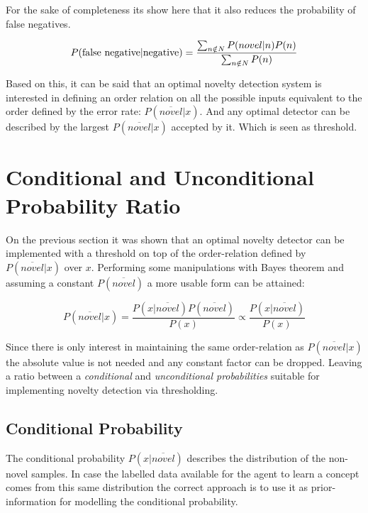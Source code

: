 For the sake of completeness its show here that it also reduces the probability
of false negatives.

\begin{equation}
P(\textnormal{false negative}|\textnormal{negative}) = \frac{\sum_{n \notin N}{P(novel|n)P(n)}}{\sum_{n \notin N}{P(n)}}
\end{equation}


Based on this, it can be said that an optimal novelty detection system is
interested in defining an order relation on all the possible inputs equivalent
to the order defined by the error rate: $P(\overline{novel}|x)$.
And any optimal detector can be described by the largest $P(\overline{novel}|x)$
accepted by it. Which is seen as threshold.


\section{Conditional and Unconditional Probability Ratio}

On the previous section it was shown that an optimal novelty detector can be
implemented with a threshold on top of the order-relation defined by
$P(\overline{novel}|x)$ over $x$. Performing some manipulations with
Bayes theorem and assuming a constant $P(\overline{novel})$ a more usable
form can be attained:

\begin{equation}
\label{eq:novelty-ratio}
          P(\overline{novel}|x)
  =       \frac{P(x|\overline{novel}) P(\overline{novel})}{P(x)}
  \propto \frac{P(x|\overline{novel})}{P(x)}
\end{equation}

Since there is only interest in maintaining the same order-relation as
$P(\overline{novel}|x)$ the absolute value is not needed and any constant
factor can be dropped. Leaving a ratio between a \emph{conditional} and
\emph{unconditional probabilities} suitable for implementing novelty detection
via  thresholding.



\subsection{Conditional Probability}
The conditional probability $P(x|\overline{novel})$ describes the distribution
of the non-novel samples. In case the labelled data available for the agent
to learn a concept comes from this same distribution the correct approach
is to use it as prior-information for modelling the conditional probability.

